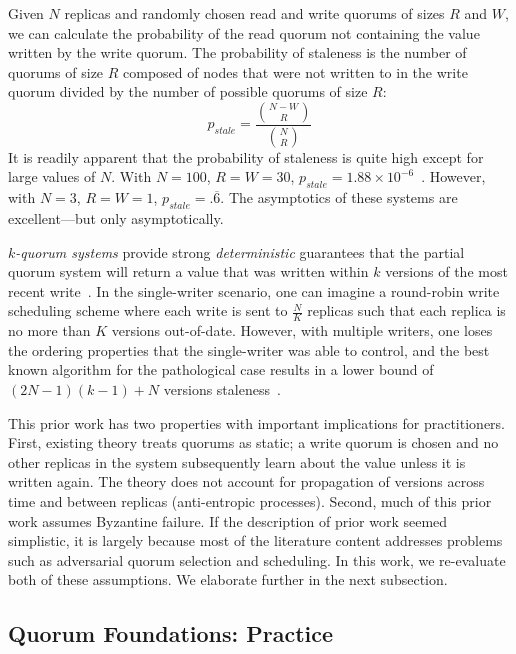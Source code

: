 \documentclass{vldb}
\begin{document}
Given $N$ replicas and randomly chosen read and write quorums of sizes
$R$ and $W$, we can calculate the probability of the read quorum not
containing the value written by the write quorum.  The probability of
staleness is the number of quorums of size $R$ composed of nodes that
were not written to in the write quorum divided by the number of
possible quorums of size $R$:
\begin{equation}
\label{eq:prob-strict}
p_{stale}=\frac{{N-W \choose R}}{{N \choose R}}
\end{equation}
It is readily apparent that the probability of staleness is quite high
except for large values of $N$.  With $N=100$, $R=W=30$, $p_{stale} =
1.88 \times 10^{-6}$~\cite{nonstrict-availability}.  However, with
$N=3$, $R=W=1$, $p_{stale} = .\overline{6}$.  The asymptotics of these
systems are excellent---but only asymptotically.  

\textit{$k$-quorum systems} provide strong \textit{deterministic}
guarantees that the partial quorum system will return a value that was
written within $k$ versions of the most recent
write~\cite{nonstrict-availability}.  In the single-writer scenario,
one can imagine a round-robin write scheduling scheme where each write
is sent to $\frac{N}{K}$ replicas such that each replica is no more
than $K$ versions out-of-date.  However, with multiple writers, one
loses the ordering properties that the single-writer was able to
control, and the best known algorithm for the pathological case
results in a lower bound of $(2N-1)(k-1)+N$ versions staleness~\cite{multi-k-quorum}.

This prior work has two properties with important implications for
practitioners.  First, existing theory treats quorums as static; a
write quorum is chosen and no other replicas in the system
subsequently learn about the value unless it is written again.  The
theory does not account for propagation of versions across time and
between replicas (anti-entropic processes).  Second, much of this
prior work assumes Byzantine failure.  If the description of prior
work seemed simplistic, it is largely because most of the literature
content addresses problems such as adversarial quorum selection and
scheduling.  In this work, we re-evaluate both of these assumptions.  We
elaborate further in the next subsection.

\subsection{Quorum Foundations: Practice}
\label{sec:practice}
\end{document}
